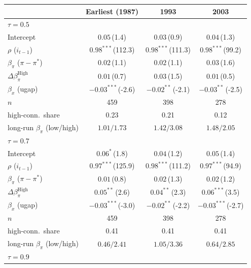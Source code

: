 \setlength{\tabcolsep}{4pt}\scriptsize
\begin{tabular}{lccc}
\toprule
 & Earliest (1987) & 1993 & 2003 \\
\midrule
\multicolumn{4}{l}{\textit{$\tau=0.5$}} \\
Intercept & $0.05$\,{\scriptsize(1.4)} & $0.03$\,{\scriptsize(0.9)} & $0.04$\,{\scriptsize(1.3)} \\
$\rho$ ($i_{t-1}$) & $0.98^{***}$\,{\scriptsize(112.3)} & $0.98^{***}$\,{\scriptsize(111.3)} & $0.98^{***}$\,{\scriptsize(99.2)} \\
$\beta_\pi$ ($\pi-\pi^*$) & $0.02$\,{\scriptsize(1.1)} & $0.02$\,{\scriptsize(1.1)} & $0.03$\,{\scriptsize(1.6)} \\
$\Delta\beta_\pi^{\text{High}}$ & $0.01$\,{\scriptsize(0.7)} & $0.03$\,{\scriptsize(1.5)} & $0.01$\,{\scriptsize(0.5)} \\
$\beta_x$ (ugap) & $-0.03^{***}$\,{\scriptsize(-2.6)} & $-0.02^{**}$\,{\scriptsize(-2.1)} & $-0.03^{**}$\,{\scriptsize(-2.5)} \\
\addlinespace
$n$ & 459 & 398 & 278 \\
high-conn.\ share & 0.23 & 0.21 & 0.12 \\
long-run $\beta_\pi$ (low/high) & $1.01/1.73$ & $1.42/3.08$ & $1.48/2.05$ \\
\midrule
\multicolumn{4}{l}{\textit{$\tau=0.7$}} \\
Intercept & $0.06^{*}$\,{\scriptsize(1.8)} & $0.04$\,{\scriptsize(1.2)} & $0.05$\,{\scriptsize(1.4)} \\
$\rho$ ($i_{t-1}$) & $0.97^{***}$\,{\scriptsize(125.9)} & $0.98^{***}$\,{\scriptsize(111.2)} & $0.97^{***}$\,{\scriptsize(94.9)} \\
$\beta_\pi$ ($\pi-\pi^*$) & $0.01$\,{\scriptsize(0.8)} & $0.02$\,{\scriptsize(1.3)} & $0.02$\,{\scriptsize(1.2)} \\
$\Delta\beta_\pi^{\text{High}}$ & $0.05^{**}$\,{\scriptsize(2.6)} & $0.04^{**}$\,{\scriptsize(2.3)} & $0.06^{***}$\,{\scriptsize(3.5)} \\
$\beta_x$ (ugap) & $-0.03^{***}$\,{\scriptsize(-3.0)} & $-0.02^{**}$\,{\scriptsize(-2.2)} & $-0.03^{***}$\,{\scriptsize(-2.7)} \\
\addlinespace
$n$ & 459 & 398 & 278 \\
high-conn.\ share & 0.41 & 0.41 & 0.41 \\
long-run $\beta_\pi$ (low/high) & $0.46/2.41$ & $1.05/3.36$ & $0.64/2.85$ \\
\midrule
\multicolumn{4}{l}{\textit{$\tau=0.9$}} \\

\end{tabular}
